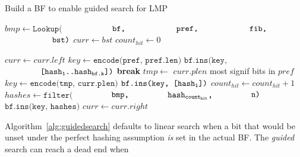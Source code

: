 \documentclass[conference,compsoc]{IEEEtran}
\begin{document}
\begin{algorithm}
  \caption{Build a BF to enable guided search for LMP}\label{alg:build}
  \begin{algorithmic}[1]


    \State $bmp \gets \texttt{Lookup(}$
        \State $\hspace*{20mm} \texttt{bf,}$
        \State $\hspace*{20mm} \texttt{pref,}$
        \State $\hspace*{20mm} \texttt{fib,}$
        \State $\hspace*{20mm} \texttt{bst)}$
    \State $curr \gets bst$
    \State $count_{hit} \gets 0$


        \State $curr \gets curr.left$
        \State $key \gets \texttt{encode(pref, pref.len)}$
        \State $\texttt{bf.ins(key,}$
                \State $\hspace*{15mm} \texttt{[hash\textsubscript{1}..hash\textsubscript{bf.k}])}$
        \State \textbf{break}
      \Else
        \State $tmp \gets$ $curr.plen$ most signif bits in $pref$
        \State $key \gets \texttt{encode(tmp, curr.plen)}$
        \State $\texttt{bf.ins(key, [hash\textsubscript{1}])}$
        \State $count_{hit} \gets count_{hit} + 1$
        \State $hashes \gets \texttt{filter(}$
              \State $\hspace*{15mm} \texttt{bmp,}$
              \State $\hspace*{15mm} \texttt{hash\textsubscript{count\textsubscript{hit}},}$
              \State $\hspace*{15mm} \texttt{n)}$
        \State $\texttt{bf.ins(key, hashes)}$
        \State $curr \gets curr.right$
      \EndIf
    \EndWhile
    \EndProcedure

  \end{algorithmic}
\end{algorithm}


Algorithm~\ref{alg:guidedsearch} defaults to linear search when a bit that
would be unset
under the perfect hashing assumption \emph{is} set in the actual BF.
The \emph{guided} search can reach a dead end when
\end{document}
